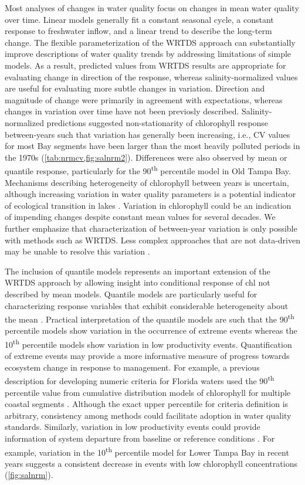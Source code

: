 \documentclass[letterpaper,12pt,oneside]{article}\usepackage{graphicx, color}
\newcommand{\nine}{90\textsuperscript{th} percentile }
\newcommand{\ten}{10\textsuperscript{th} percentile }
\begin{document}
Most analyses of changes in water quality focus on changes in mean water quality over time.  Linear models generally fit a constant seasonal cycle, a constant response to freshwater inflow, and a linear trend to describe the long-term change.  The flexible parameterization of the \ac{WRTDS} approach can substantially improve descriptions of water quality trends by addressing limitations of simple models.  As a result, predicted values from \ac{WRTDS} results are appropriate for evaluating change in direction of the response, whereas salinity-normalized values are useful for evaluating more subtle changes in variation.  Direction and magnitude of change were primarily in agreement with expectations, whereas changes in variation over time have not been previosly described.  Salinity-normalized predictions suggested non-stationarity of chlorophyll response between-years such that variation has generally been increasing, i.e., \ac{CV} values for most Bay segments have been larger than the most heavily polluted periods in the 1970s (\cref{tab:nrmcv,fig:salnrm2}).  Differences were also observed by mean or quantile response, particularly for the \nine model in Old Tampa Bay.  Mechanisms describing heterogeneity of chlorophyll between years is uncertain, although increasing variation in water quality parameters is a potential indicator of ecological transition in lakes \citep{Carpenter06}.   Variation in chlorophyll could be an indication of impending changes despite constant mean values for several decades.  We further emphasize that characterization of between-year variation is only possible with methods such as \ac{WRTDS}.  Less complex approaches that are not data-driven may be unable to resolve this variation \citep[e.g., additive seasonal models, ][]{Cloern10}.     

The inclusion of quantile models represents an important extension of the \ac{WRTDS} approach by allowing insight into conditional response of \ac{chl} not described by mean models.  Quantile models are particularly useful for characterizing response variables that exhibit considerable heterogeneity about the mean \citep{Terrell96,Cade03}.  Practical interpretation of the quantile models are such that the \nine models show variation in the occurrence of extreme events whereas the \ten models show variation in low productivity events.  Quantification of extreme events may provide a more informative measure of progress towards ecosystem change in response to management.  For example, a previous description for developing numeric criteria for Florida waters used the \nine value from cumulative distribution models of chlorophyll for multiple coastal segments \citep{Schaeffer12}.  Although the exact upper percentile for criteria definition is arbitrary, consistency among methods could facilitate adoption in water quality standards.  Similarly, variation in low productivity events could provide information of system departure from baseline or reference conditions \citep[e.g., ][]{Stoddard06}. For example, variation in the \ten model for Lower Tampa Bay in recent years suggests a consistent decrease in events with low chlorophyll concentrations (\cref{fig:salnrm}).
\end{document}
